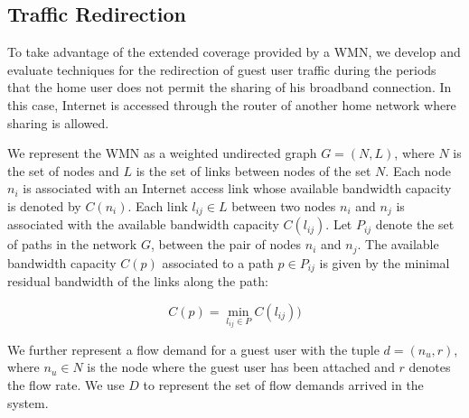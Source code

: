 \subsection{Traffic Redirection}
\label{architecture:redirection}

To take advantage of the extended coverage provided by a WMN, we develop and evaluate techniques for the redirection of guest user traffic during the periods that the home user does not permit the sharing of his broadband connection. In this case, Internet is accessed through the router of another home network where sharing is allowed. 


We represent the WMN as a weighted undirected graph $G = (N, L)$, where $N$ is the set of nodes and $L$ is the set of links between nodes of the set $N$. Each node $n_i$ is associated with an Internet access link whose available bandwidth capacity is denoted by $C(n_i)$. Each link $l_{ij} \in L$ between two nodes $n_i$ and $n_j$ is associated with the available bandwidth capacity $C(l_{ij})$. Let $P_{ij}$ denote the set of paths in the network $G$, between the pair of nodes $n_i$ and $n_j$. The available bandwidth capacity $C(p)$ associated to a path $p \in P_{ij}$ is given by the minimal residual bandwidth of the links along the path:

\vspace{-3mm}
\begin{equation}\label{1}
C(p) = \min_{l_{ij} \in P} C(l_{ij}))
\end{equation}
\vspace{-2mm}


We further represent a flow demand for a guest user with the tuple $d = (n_u, r)$, where $n_u \in N$ is the node where the guest user has been attached and $r$ denotes the flow rate. We use $D$ to represent the set of flow demands arrived in the system.


